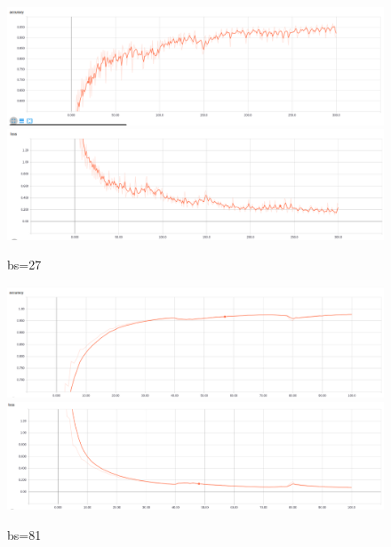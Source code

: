\documentclass{article}
\begin{document}
\begin{figure}[h]
	\caption{bs=27}
	\centering
	\includegraphics[width=\textwidth]{acc_log-model_1AG-gsbb_2C1-bs27-xyz-color_1norm-2048-mat}
	\includegraphics[width=\textwidth]{loss_log-model_1AG-gsbb_2C1-bs27-xyz-color_1norm-2048-mat}
\end{figure}
\begin{figure}[h]
	\centering
	\caption{bs=81}
	\includegraphics[width=\textwidth]{acc_log-model_1AG-gsbb_2C1-bs81-xyz-color_1norm-2048-mat}
	\includegraphics[width=\textwidth]{loss_log-model_1AG-gsbb_2C1-bs81-xyz-color_1norm-2048-mat}
\end{figure}
\end{document}
